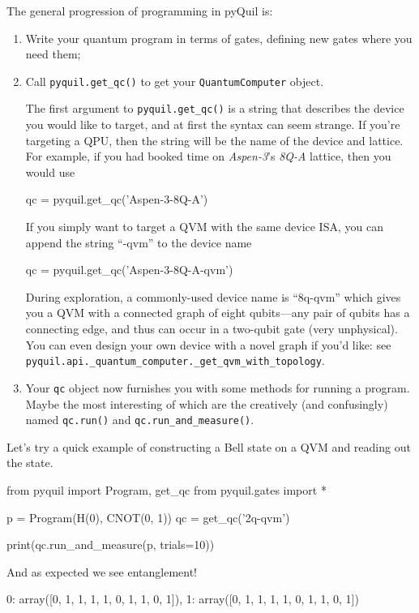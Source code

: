 The general progression of programming in pyQuil is:
\begin{enumerate}
\item Write your quantum program in terms of gates, defining new gates where you need them;
\item Call \verb|pyquil.get_qc()| to get your \verb|QuantumComputer| object. 

The first argument to \verb|pyquil.get_qc()| is a string that describes the device you would like to target, and at first the syntax can seem strange. If you're targeting a QPU, then the string will be the name of the device and lattice. For example, if you had booked time on \emph{Aspen-3}'s \emph{8Q-A} lattice, then you would use
\begin{python} 
qc = pyquil.get_qc('Aspen-3-8Q-A')
\end{python}
If you simply want to target a QVM with the same device ISA, you can append the string ``-qvm'' to the device name
\begin{python}
qc = pyquil.get_qc('Aspen-3-8Q-A-qvm')
\end{python}

During exploration, a commonly-used device name is ``8q-qvm'' which gives you a QVM with a connected graph of eight qubits---any pair of qubits has a connecting edge, and thus can occur in a two-qubit gate (very unphysical). You can even design your own device with a novel graph if you'd like: see \verb|pyquil.api._quantum_computer._get_qvm_with_topology|.
\item Your \verb|qc| object now furnishes you with some methods for running a program. Maybe the most interesting of which are the creatively (and confusingly) named \verb|qc.run()| and \verb|qc.run_and_measure()|.
\end{enumerate}

Let's try a quick example of constructing a Bell state on a QVM and reading out the state.

\begin{python}
from pyquil import Program, get_qc
from pyquil.gates import *

p = Program(H(0), CNOT(0, 1))
qc = get_qc('2q-qvm')

print(qc.run_and_measure(p, trials=10))
\end{python}

And as expected we see entanglement!

\begin{python}
{0: array([0, 1, 1, 1, 1, 0, 1, 1, 0, 1]), 
 1: array([0, 1, 1, 1, 1, 0, 1, 1, 0, 1])}
\end{python}

